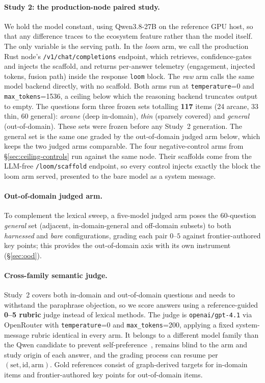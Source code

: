 \documentclass[10pt,twocolumn]{article}
\begin{document}
\paragraph{Study 2: the production-node paired study.} We hold the model constant, using Qwen3.8-27B on the reference GPU host, so that any difference traces to the ecosystem feature rather than the model itself. The only variable is the serving path. In the \emph{loom} arm, we call the production Rust node's \texttt{/v1/chat/completions} endpoint, which retrieves, confidence-gates and injects the scaffold, and returns per-answer telemetry (engagement, injected tokens, fusion path) inside the response \texttt{loom} block. The \emph{raw} arm calls the same model backend directly, with no scaffold. Both arms run at \texttt{temperature}=0 and \texttt{max\_tokens}=1536, a ceiling below which the reasoning backend truncates output to empty. The questions form three frozen sets totalling \textbf{117} items (24 arcane, 33 thin, 60 general): \emph{arcane} (deep in-domain), \emph{thin} (sparsely covered) and \emph{general} (out-of-domain). These sets were frozen before any Study~2 generation. The general set is the same one graded by the out-of-domain judged arm below, which keeps the two judged arms comparable. The four negative-control arms from \S\ref{sec:ceiling-controls} run against the same node. Their scaffolds come from the LLM-free \texttt{/loom/scaffold} endpoint, so every control injects exactly the block the loom arm served, presented to the bare model as a system message.

\paragraph{Out-of-domain judged arm.} To complement the lexical sweep, a five-model judged arm poses the 60-question \emph{general} set (adjacent, in-domain-general and off-domain subsets) to both \emph{harnessed} and \emph{bare} configurations, grading each pair $0$--$5$ against frontier-authored key points; this provides the out-of-domain axis with its own instrument (\S\ref{sec:ood}).

\paragraph{Cross-family semantic judge.} Study~2 covers both in-domain and out-of-domain questions and needs to withstand the paraphrase objection, so we score answers using a reference-guided \textbf{0--5 rubric} judge instead of lexical methods. The judge is \texttt{openai/gpt-4.1} via OpenRouter with \texttt{temperature}=0 and \texttt{max\_tokens}=200, applying a fixed system-message rubric identical in every arm. It belongs to a different model family than the Qwen candidate to prevent self-preference~\cite{zheng2023judging,panickssery2024selfpreference}, remains blind to the arm and study origin of each answer, and the grading process can resume per $(\text{set},\text{id},\text{arm})$. Gold references consist of graph-derived targets for in-domain items and frontier-authored key points for out-of-domain items.
\end{document}
